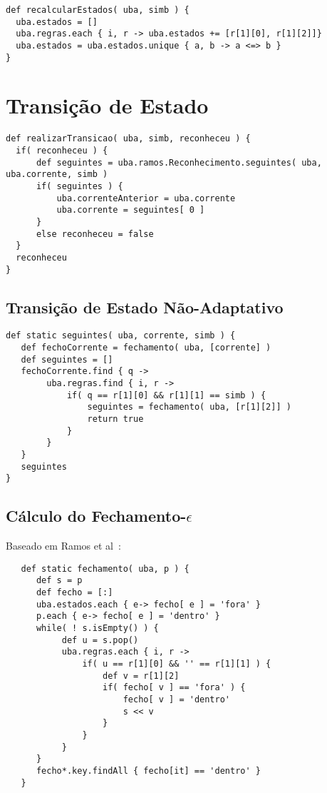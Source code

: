 \begin{lstlisting}
def recalcularEstados( uba, simb ) {
  uba.estados = []
  uba.regras.each { i, r -> uba.estados += [r[1][0], r[1][2]]}
  uba.estados = uba.estados.unique { a, b -> a <=> b }
}
\end{lstlisting}


\section{Transição de Estado}
\label{sec:isv:execucao-transicao}

\begin{lstlisting}
def realizarTransicao( uba, simb, reconheceu ) {
  if( reconheceu ) {
      def seguintes = uba.ramos.Reconhecimento.seguintes( uba, uba.corrente, simb )
      if( seguintes ) {
          uba.correnteAnterior = uba.corrente
          uba.corrente = seguintes[ 0 ]
      }
      else reconheceu = false
  }
  reconheceu
}
\end{lstlisting}

\subsection{Transição de Estado Não-Adaptativo}

\begin{lstlisting}
def static seguintes( uba, corrente, simb ) {
   def fechoCorrente = fechamento( uba, [corrente] )
   def seguintes = []
   fechoCorrente.find { q ->
        uba.regras.find { i, r ->
            if( q == r[1][0] && r[1][1] == simb ) {
                seguintes = fechamento( uba, [r[1][2]] )
                return true
            }
        }
   }
   seguintes
}
\end{lstlisting}

\subsection{Cálculo do Fechamento-$\epsilon$}

Baseado em Ramos et al~\cite{ramos:2009:lftmi}:

\begin{lstlisting}
   def static fechamento( uba, p ) {
      def s = p
      def fecho = [:]
      uba.estados.each { e-> fecho[ e ] = 'fora' }
      p.each { e-> fecho[ e ] = 'dentro' }
      while( ! s.isEmpty() ) {
           def u = s.pop()
           uba.regras.each { i, r ->
               if( u == r[1][0] && '' == r[1][1] ) {
                   def v = r[1][2]
                   if( fecho[ v ] == 'fora' ) {
                       fecho[ v ] = 'dentro'
                       s << v
                   }
               }
           }
      }
      fecho*.key.findAll { fecho[it] == 'dentro' }
   }
\end{lstlisting}



